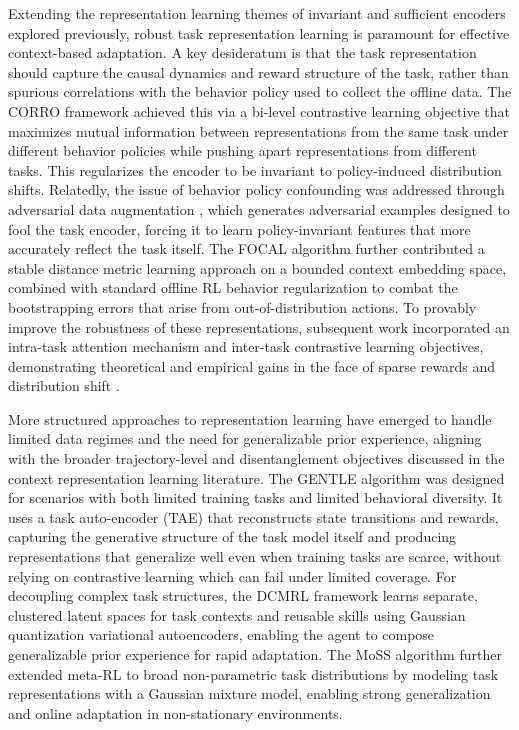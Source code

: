 \documentclass[11pt]{article}
\begin{document}
Extending the representation learning themes of invariant and sufficient encoders explored previously, robust task representation learning is paramount for effective context-based adaptation. A key desideratum is that the task representation should capture the causal dynamics and reward structure of the task, rather than spurious correlations with the behavior policy used to collect the offline data. The CORRO framework \cite{ref336} achieved this via a bi-level contrastive learning objective that maximizes mutual information between representations from the same task under different behavior policies while pushing apart representations from different tasks. This regularizes the encoder to be invariant to policy-induced distribution shifts. Relatedly, the issue of behavior policy confounding was addressed through adversarial data augmentation \cite{ref337}, which generates adversarial examples designed to fool the task encoder, forcing it to learn policy-invariant features that more accurately reflect the task itself. The FOCAL algorithm \cite{ref338} further contributed a stable distance metric learning approach on a bounded context embedding space, combined with standard offline RL behavior regularization to combat the bootstrapping errors that arise from out-of-distribution actions. To provably improve the robustness of these representations, subsequent work incorporated an intra-task attention mechanism and inter-task contrastive learning objectives, demonstrating theoretical and empirical gains in the face of sparse rewards and distribution shift \cite{ref339}.

More structured approaches to representation learning have emerged to handle limited data regimes and the need for generalizable prior experience, aligning with the broader trajectory-level and disentanglement objectives discussed in the context representation learning literature. The GENTLE algorithm \cite{ref340} was designed for scenarios with both limited training tasks and limited behavioral diversity. It uses a task auto-encoder (TAE) that reconstructs state transitions and rewards, capturing the generative structure of the task model itself and producing representations that generalize well even when training tasks are scarce, without relying on contrastive learning which can fail under limited coverage. For decoupling complex task structures, the DCMRL framework \cite{ref321} learns separate, clustered latent spaces for task contexts and reusable skills using Gaussian quantization variational autoencoders, enabling the agent to compose generalizable prior experience for rapid adaptation. The MoSS algorithm \cite{ref311} further extended meta-RL to broad non-parametric task distributions by modeling task representations with a Gaussian mixture model, enabling strong generalization and online adaptation in non-stationary environments.
\end{document}
